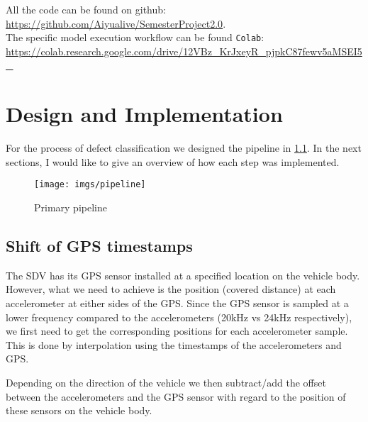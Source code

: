 \noindent All the code can be found on github: \\
\url{https://github.com/Aiyualive/SemesterProject2.0}.\\

\noindent The specific model execution workflow can be found \verb|Colab|:\\
\url{https://colab.research.google.com/drive/12VBz_KrJxeyR_pjpkC87fewv5aMSEI5_}



\chapter{Design and Implementation}

For the process of defect classification we designed the pipeline in \ref{fig:pipeline}. In the next sections, I would like to give an overview of how each step was implemented.
\begin{figure}[H]
	\centering
	\texttt{[image: imgs/pipeline]}
	\caption{Primary pipeline}
	\label{fig:pipeline}
\end{figure}




\section{Shift of GPS timestamps}
The SDV has its GPS sensor installed at a specified location on the vehicle body. However, what we need to achieve is the position (covered distance) at each accelerometer at either sides of the GPS. Since the GPS sensor is sampled at a lower frequency compared to the accelerometers (20kHz vs 24kHz respectively), we first need to get the corresponding positions for each accelerometer sample. This is done by interpolation using the timestamps of the accelerometers and GPS. 

Depending on the direction of the vehicle we then subtract/add the offset between the accelerometers and the GPS sensor with regard to the position of these sensors on the vehicle body. 

